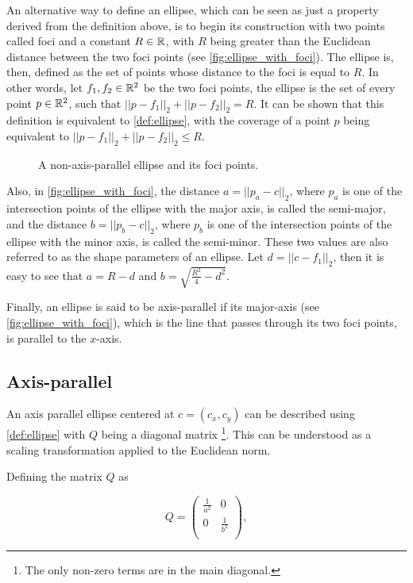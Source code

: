 An alternative way to define an ellipse, which can be seen as just a property derived from the definition above, is to begin its construction with two points called foci and a constant $R \in \mathbb{R}$, with $R$ being greater than the Euclidean distance between the two foci points (see \autoref{fig:ellipse_with_foci}). The ellipse is, then, defined as the set of points whose distance to the foci is equal to $R$. In other words, let $f_1, f_2 \in \mathbb{R}^2$ be the two foci points, the ellipse is the set of every point $p \in \mathbb{R}^2$, such that $||p-f_1||_2 + ||p-f_2||_2 = R$. It can be shown that this definition is equivalent to \autoref{def:ellipse}, with the coverage of a point $p$ being equivalent to $||p-f_1||_2 + ||p-f_2||_2 \le R$.

\begin{figure}[H]
    \centering
    
    \caption{A non-axis-parallel ellipse and its foci points.}
    
    \fautor
    \label{fig:ellipse_with_foci}
\end{figure}

Also, in \autoref{fig:ellipse_with_foci}, the distance $a = ||p_a - c||_2$, where $p_a$ is one of the intersection points of the ellipse with the major axis, is called the semi-major, and the distance $b = ||p_b-c||_2$, where $p_b$ is one of the intersection points of the ellipse with the minor axis, is called the semi-minor. These two values are also referred to as the shape parameters of an ellipse. Let $d = ||c-f_1||_2$, then it is easy to see that $a = R - d$ and $b = \sqrt{\frac{R^2}{4} - d^2}$.

Finally, an ellipse is said to be axis-parallel if its major-axis (see \autoref{fig:ellipse_with_foci}), which is the line that passes through its two foci points, is parallel to the $x$-axis.

\subsection{Axis-parallel}

An axis parallel ellipse centered at $c = (c_x,c_y)$ can be described using \autoref{def:ellipse} with $Q$ being a diagonal matrix \footnote{The only non-zero terms are in the main diagonal.}. This can be understood as a scaling transformation applied to the Euclidean norm.

Defining the matrix $Q$ as

\[
Q=
\left( {\begin{array}{cc}
    \frac{1}{a^2} & 0 \\
    0 & \frac{1}{b^2} \\
    \end{array} } \right),
\]

